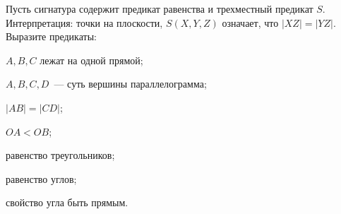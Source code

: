 Пусть сигнатура содержит предикат равенства и трехместный предикат $S$. Интерпретация: точки на
плоскости, $S(X, Y, Z)$ означает, что $|XZ| = |YZ|$. Выразите предикаты:
\begin{enumcyr}
    \item $A, B, C$ лежат на одной прямой;
    \item $A, B, C, D$~--- суть вершины параллелограмма;
    \item $|AB| = |CD|$;
    \item $OA < OB$;
    \item равенство треугольников;
    \item равенство углов;
    \item свойство угла быть прямым.
\end{enumcyr}